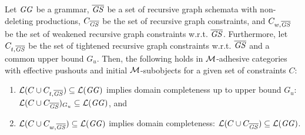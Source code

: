 \begin{theorem}
\label{thm:sec-compl-software-trans:dom_compl_inf}
Let $\mathit{GG}$ be a grammar, $\overline{\mathit{GS}}$ be a set of recursive graph schemata with non-deleting productions, $C_{\overline{\mathit{GS}}}$ be the set of recursive graph constraints, and $C_{w,\overline{\mathit{GS}}}$ be the set of weakened recursive graph constraints w.r.t. $\overline{\mathit{GS}}$.
Furthermore, let $C_{t,\overline{\mathit{GS}}}$ be the set of tightened recursive graph constraints w.r.t. $\overline{\mathit{GS}}$ and a common upper bound $G_u$.
Then, the following holds in ${\cal M}$-adhesive categories with effective pushouts and initial ${\cal M}$-subobjects for a given set of constraints $C$:
\begin{enumerate}
  \item \label{thm:sec-compl-software-trans:dom_compl_inf:1}$\mathcal{L}(C \cup C_{t,\overline{\mathit{GS}}}) \subseteq \mathcal{L}(\mathit{GG})$ implies domain completeness up to upper bound $G_u$: $\mathcal{L}(C \cup C_{\overline{\mathit{GS}}})_{G_u} \subseteq \mathcal{L}(\mathit{GG})$, and
  \item \label{thm:sec-compl-software-trans:dom_compl_inf:2}$\mathcal{L}(C \cup C_{w,\overline{\mathit{GS}}}) \subseteq \mathcal{L}(\mathit{GG})$ implies domain completeness: $\mathcal{L}(C \cup C_{\overline{\mathit{GS}}}) \subseteq \mathcal{L}(\mathit{GG})$.
  \envEndMarker
\end{enumerate}
\end{theorem}

